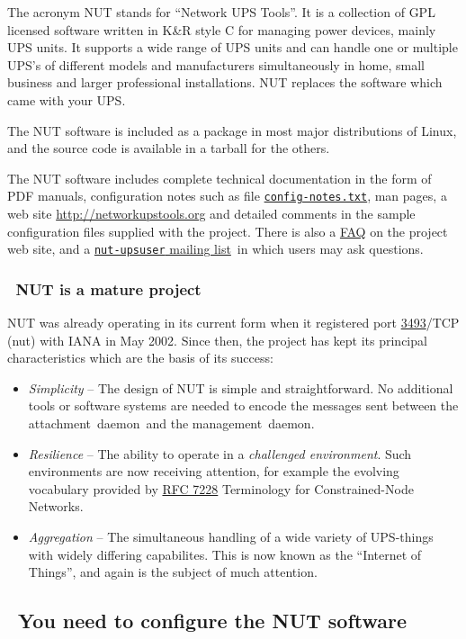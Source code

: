 \documentclass[12pt]{article}
\newlength{\headersep}\setlength{\headersep}{3mm}
\newcommand{\Hsep}{\hspace{\headersep}}
\newcommand{\ad}{\mbox{\textcolor{UPSDCOLOUR}{attachment daemon}}}
\newcommand{\md}{\mbox{\textcolor{MONCOLOUR}{management daemon}}}
\newcommand{\RFCcnn}{\href{https://www.rfc-editor.org/info/rfc7228}%
                          {RFC 7228} Terminology for Constrained-Node Networks}
\newcommand{\IANAnut}{\href{https://www.iana.org/assignments/service-names-port-numbers/service-names-port-numbers.xhtml?search=3493}%
                           {3493}}
\newcommand{\mailinglist}{\href{https://lists.alioth.debian.org/mailman/listinfo/nut-upsuser}%
                               {\texttt{nut-upsuser} mailing list}}
\newcommand{\ul}{\begin{itemize}%
   \setlength{\itemsep}{0em}}
\newcommand{\eul}{\end{itemize}}
\newcommand{\li}{\item}                 %
\begin{document}
The acronym NUT stands for ``Network UPS Tools''.  It is a collection of GPL
licensed software written in K\&R style C for managing power devices, mainly
UPS units.  It supports a wide range of UPS units and can handle one or
multiple UPS's of different models and manufacturers simultaneously in home,
small business and larger professional installations.  NUT replaces the
software which came with your UPS.

The NUT software is included as a package in most major distributions of
Linux, and the source code is available in a tarball for the others.

The NUT software includes complete technical documentation in the form of PDF
manuals, configuration notes such as file
\href{https://github.com/networkupstools/nut/blob/master/docs/config-notes.txt}
     {\texttt{config{\allowbreak}-notes.txt}}, man pages, a web site
\href{http://networkupstools.org}{http://{\allowbreak}networkupstools{\allowbreak}.org}
and detailed comments in the sample configuration files supplied with the
project.  There is also a
\href{http://networkupstools.org/docs/FAQ.html}{FAQ} on the project web
site, and a \mailinglist\ in which users may ask questions.


\subsubsection{\Hsep\ NUT is a mature project}\label{matureproject}

NUT was already operating in its current form when it registered port
\IANAnut/TCP (nut) with IANA in May 2002.  Since then, the project has
kept its principal characteristics which are the basis of its success:

\ul

\li \textit{Simplicity} -- The design of NUT is simple and
straightforward.  No additional tools or software systems are needed
to encode the messages sent between the \ad\ and the \md.

\li \textit{Resilience} -- The ability to operate in a
\textit{challenged environment}.  Such environments are now receiving
attention, for example the evolving vocabulary provided by \RFCcnn.

\li \textit{Aggregation} -- The simultaneous handling of a wide variety of
UPS-things with widely differing capabilites.  This is now known as
the ``Internet of Things'', and again is the subject of much attention.

\eul

\subsection{\Hsep\ You need to configure the NUT software}\label{needtoconfigure}
\end{document}
